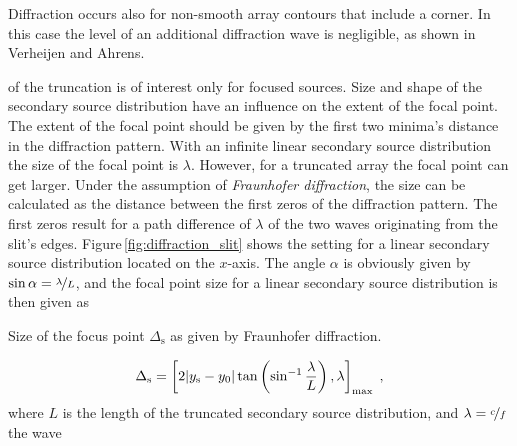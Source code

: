 Diffraction occurs also for non-smooth array contours that include a corner. In
this case the level of an additional diffraction wave is negligible, as shown
in Verheijen\autocite[][Fig.\,2.22]{Verheijen1997} and
Ahrens\autocite[][Fig.\,3.26 and 3.27]{Ahrens2012}.

 of the truncation is of interest only for focused
sources.
Size and shape of the secondary source distribution have an influence on
the extent of the focal point. The extent of the focal point should be given by
the first two minima's distance in the diffraction pattern.
With an infinite linear secondary source distribution the size of the 
focal point is $\lambda$.
However, for a truncated array the focal point can get larger.
Under the assumption of
\emph{Fraunhofer diffraction},\autocite[][Sect.\,8.3, (34). Diffraction
for a focal point is equivalent to diffraction for plane waves coming from
infinity and focus them by a lens -- compare Figure\,8.6.
For plane waves from infinity eq.\,34 is automatically fullfilled.]{Born1999}
the size can be
calculated as the distance between the first zeros of the diffraction pattern.
The first zeros result for a path difference of $\lambda$ of the two waves
originating from the slit's edges.
Figure\,\ref{fig:diffraction_slit} shows the setting for a linear secondary
source distribution located on the $x$-axis. The angle
$\alpha$ is obviously given by $\sin\alpha =
\nicefrac{\lambda}{L}$, and the focal point size for a linear secondary source
distribution is then 
given as\autocite[][(13)]{Wierstorf2013a}
%
\begin{marginfigure}
    \ft
    \centering
    
    \caption{Size of the focus point $\Delta_\text{s}$ as given by Fraunhofer
    diffraction.
    }
    \label{fig:diffraction_slit}
\end{marginfigure}
%
\begin{equation}
    \Delta_\text{s} =
    \left[ 2|y_\text{s}-y_0| \tan\left(\sin^{-1} \frac{\lambda}{L}
    \right), \lambda \right]_\text{max} \qc
    \label{eq:focus_size}
\end{equation}
where $L$ is the length of the
truncated secondary source distribution, and $\lambda = \nicefrac{c}{f}$ the wave
